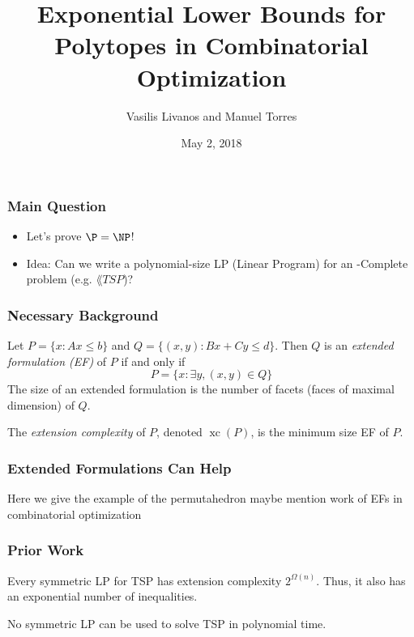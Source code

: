 \documentclass{beamer}
\author[Livanos, Torres]{Vasilis Livanos and Manuel Torres}
\title[Exp. Lower Bounds for Polytopes]{Exponential Lower Bounds for Polytopes in Combinatorial Optimization}
\institute[UIUC]{University of Illinois at Urbana-Champaign}
\date{May 2, 2018}
\newcommand{\xc}{\operatorname{xc}}
\begin{document}
\begin{frame}
\titlepage
\end{frame}


\begin{frame}
\frametitle{Main Question}

\pause
\begin{itemize}
\item Let's prove $\P = \NP$!
\pause
\item Idea: Can we write a polynomial-size LP (Linear Program) for an \NP-Complete problem (e.g. $\lang{TSP}$)?
\end{itemize}
\end{frame}


\begin{frame}
\frametitle{Necessary Background}

\pause
\begin{definition}
Let $P = \{x : Ax \leq b\}$ and $Q = \{(x,y) : Bx + Cy \leq d\}$. Then $Q$ is an \emph{extended formulation (EF)} of $P$ if and only if
\[
P = \{x : \exists y , (x,y) \in Q\}
\]
The size of an extended formulation is the number of facets (faces of maximal dimension) of $Q$.
\end{definition}

\pause
\begin{definition}
The \emph{extension complexity} of $P$, denoted $\xc(P)$, is the minimum size EF of $P$.
\end{definition}

\end{frame}


\begin{frame}
\frametitle{Extended Formulations Can Help}
Here we give the example of the permutahedron
maybe mention work of EFs in combinatorial optimization
\end{frame}


\begin{frame}
\frametitle{Prior Work}

\pause
\begin{theorem}[Yannakakis, '91]
Every symmetric LP for TSP has extension complexity $2^{\Omega(n)}$. Thus, it also has an exponential number of inequalities.
\end{theorem}

\pause
\begin{corollary}
No symmetric LP can be used to solve TSP in polynomial time.
\end{corollary}

\end{frame}
\end{document}
